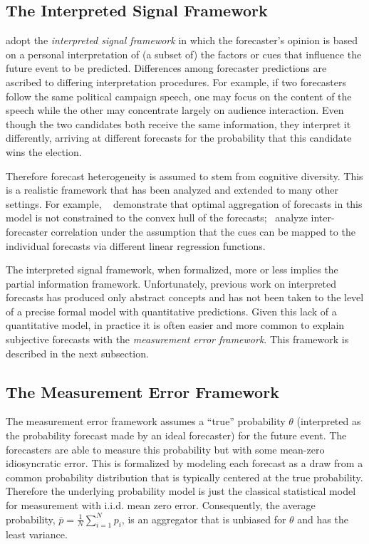 \documentclass[11pt]{article}
\theoremstyle{definition}
\theoremstyle{definition}
\def\pb{\overline{p}}
\begin{document}
\subsection{The Interpreted Signal Framework}
\label{ss:inerpreted}

\citet{hong2009interpreted} adopt the {\em interpreted 
signal framework} in which the forecaster's opinion is based on a personal
interpretation of (a subset of) the factors or cues that influence
the future event to be predicted.  Differences among forecaster
predictions are ascribed to differing interpretation procedures.
For example, if two forecasters follow the same political campaign
speech, one may focus on the content of the speech while the other 
may concentrate largely on audience interaction.  Even though the
two candidates both receive the same information, they interpret
it differently, arriving at different forecasts for the probability
that this candidate wins the election.  

Therefore forecast heterogeneity is assumed to
stem from cognitive diversity.  This is a realistic framework that
has been analyzed and extended to many other settings.  For example,
~\citet{parunak2013characterizing} demonstrate that optimal aggregation of
forecasts in this model is not constrained to the convex 
hull of the forecasts;~\citet{broomell2009experts}
analyze inter-forecaster correlation
under the assumption that the cues can be mapped to the individual
forecasts via different linear regression functions.

The interpreted signal framework, when formalized, more or less implies 
the partial information framework.  Unfortunately, previous work on
interpreted forecasts has produced only abstract concepts and 
has not been taken to the level of a precise formal model with 
quantitative predictions.  Given this lack of a quantitative model, in practice it is often easier and more common to explain subjective
forecasts with the {\em measurement error framework}. This framework is described in the next subsection.

\subsection{The Measurement Error Framework}
\label{ss:measurement}
The measurement error framework assumes a ``true'' probability $\theta$ (interpreted
as the probability forecast made by an ideal forecaster) for the future 
event.  The forecasters are able to measure this probability but with
some mean-zero idiosyncratic error.  This is formalized by modeling each forecast
as a draw from a common probability distribution that is typically 
centered at the true probability.  
%
Therefore the underlying probability model is just the classical statistical
model for measurement with i.i.d. mean zero error.  Consequently, the average probability, $\pb = \frac{1}{N}\sum_{i=1}^N p_i$,
is an aggregator that is unbiased for $\theta$ and has the least variance.
\end{document}
